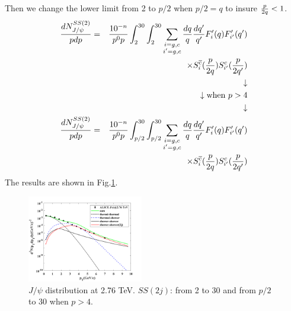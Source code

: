 \documentclass[twocolumn,aps,superscriptaddress,nofootinbib,floatfix]{revtex4}
\begin{document}
Then we change the lower limit from 2 to $p/2$ when $p/2=q$ to insure ${p\over 2q}<1$.
\begin{eqnarray}
	\frac{dN^{SS(2)}_{J/\psi}}{pdp}&=&\frac{10^{-n}}{p^0p}
	\int^{30}_{2}\int^{30}_{2}
	\sum_{\substack{i=g,c\\ i'=g,c}}  \frac{dq}{q}\frac{dq'}{q'}F'_i(q)F'_{i'}(q')\nonumber \\
	&&\times  S_i^{\overline c}({p\over 2q})   S_{i'}^c({p\over 2q'})\\
	&&\downarrow   \nonumber \\
	&&\downarrow   \text{when $p>4$}	 \nonumber \\
	&&\downarrow   \nonumber \\
	\frac{dN^{SS(2)}_{J/\psi}}{pdp}&=&\frac{10^{-n}}{p^0p}
	\int^{30}_{p/2}\int^{30}_{p/2}
	\sum_{\substack{i=g,c\\ i'=g,c}}  \frac{dq}{q}\frac{dq'}{q'}F'_i(q)F'_{i'}(q')\nonumber \\
	&&\times  S_i^{\overline c}({p\over 2q})   S_{i'}^c({p\over 2q'})\label{int_ss2j}
\end{eqnarray}
The results are shown in Fig.\ref{fig20}.
\begin{figure}[H]
	\includegraphics[width=0.45\textwidth]{2p_2_30.png}
	\caption{$J/\psi$ distribution at 2.76 TeV. $SS(2j)$: from 2 to 30 and from $p/2$ to 30 when $p>4$.}
	\label{fig20}
\end{figure}
\end{document}
